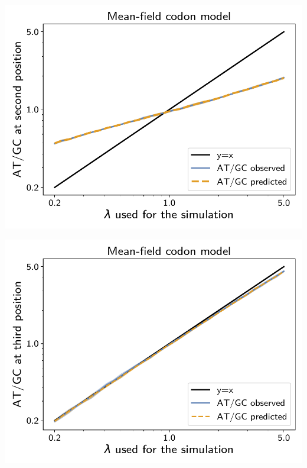 \documentclass{article}
\begin{document}
\begin{center}
    \begin{minipage}{0.325\linewidth}
        \includegraphics[width=\linewidth, page=1]{inference_simulations/obs_atgc_2_MF.pdf}
    \end{minipage}
    \begin{minipage}{0.325\linewidth}
        \includegraphics[width=\linewidth, page=1]{inference_simulations/obs_atgc_3_MF.pdf}
    \end{minipage}
    \begin{minipage}{0.325\linewidth}

\end{minipage}
\end{center}
\end{document}
